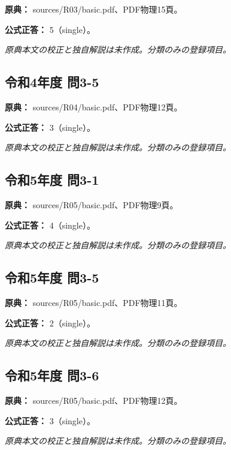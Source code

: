 \noindent\textbf{原典：} sources/R03/basic.pdf、PDF物理15頁。

\textbf{公式正答：} 5（single）。

\par\textit{原典本文の校正と独自解説は未作成。分類のみの登録項目。}

\subsection{令和4年度 問3-5}
\label{q:r04-reg-basic-3-5}

\noindent\textbf{原典：} sources/R04/basic.pdf、PDF物理12頁。

\textbf{公式正答：} 3（single）。

\par\textit{原典本文の校正と独自解説は未作成。分類のみの登録項目。}

\subsection{令和5年度 問3-1}
\label{q:r05-reg-basic-3-1}

\noindent\textbf{原典：} sources/R05/basic.pdf、PDF物理9頁。

\textbf{公式正答：} 4（single）。

\par\textit{原典本文の校正と独自解説は未作成。分類のみの登録項目。}

\subsection{令和5年度 問3-5}
\label{q:r05-reg-basic-3-5}

\noindent\textbf{原典：} sources/R05/basic.pdf、PDF物理11頁。

\textbf{公式正答：} 2（single）。

\par\textit{原典本文の校正と独自解説は未作成。分類のみの登録項目。}

\subsection{令和5年度 問3-6}
\label{q:r05-reg-basic-3-6}

\noindent\textbf{原典：} sources/R05/basic.pdf、PDF物理12頁。

\textbf{公式正答：} 3（single）。

\par\textit{原典本文の校正と独自解説は未作成。分類のみの登録項目。}

